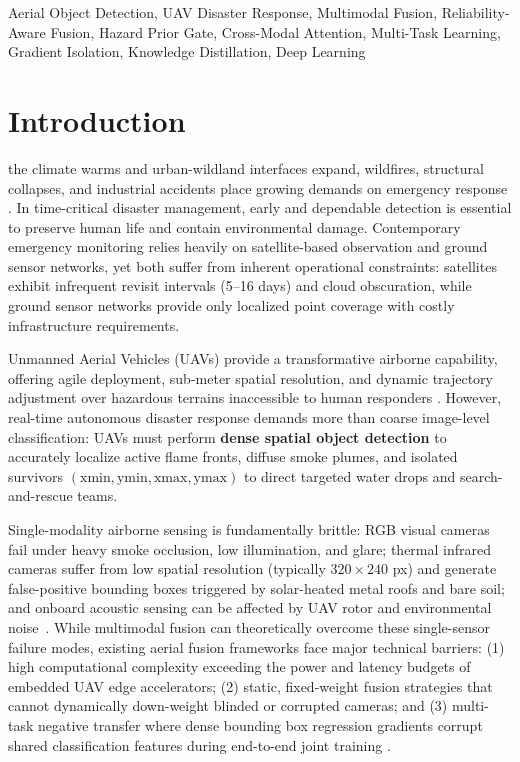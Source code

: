 \documentclass[journal]{IEEEtran}
\begin{document}
\begin{IEEEkeywords}
Aerial Object Detection, UAV Disaster Response, Multimodal Fusion, Reliability-Aware Fusion, Hazard Prior Gate, Cross-Modal Attention, Multi-Task Learning, Gradient Isolation, Knowledge Distillation, Deep Learning
\end{IEEEkeywords}

\IEEEpeerreviewmaketitle


\section{Introduction}

 the climate warms and urban-wildland interfaces expand, wildfires, structural collapses, and industrial accidents place growing demands on emergency response \cite{erdelj2017help}. In time-critical disaster management, early and dependable detection is essential to preserve human life and contain environmental damage. Contemporary emergency monitoring relies heavily on satellite-based observation and ground sensor networks, yet both suffer from inherent operational constraints: satellites exhibit infrequent revisit intervals (5--16 days) and cloud obscuration, while ground sensor networks provide only localized point coverage with costly infrastructure requirements.

Unmanned Aerial Vehicles (UAVs) provide a transformative airborne capability, offering agile deployment, sub-meter spatial resolution, and dynamic trajectory adjustment over hazardous terrains inaccessible to human responders \cite{merino2012unmanned}. However, real-time autonomous disaster response demands more than coarse image-level classification: UAVs must perform \textbf{dense spatial object detection} to accurately localize active flame fronts, diffuse smoke plumes, and isolated survivors $(\text{xmin}, \text{ymin}, \text{xmax}, \text{ymax})$ to direct targeted water drops and search-and-rescue teams.

Single-modality airborne sensing is fundamentally brittle: RGB visual cameras fail under heavy smoke occlusion, low illumination, and glare; thermal infrared cameras suffer from low spatial resolution (typically $320\times240$ px) and generate false-positive bounding boxes triggered by solar-heated metal roofs and bare soil; and onboard acoustic sensing can be affected by UAV rotor and environmental noise~\cite{gupta2025droneaudioset}. While multimodal fusion can theoretically overcome these single-sensor failure modes, existing aerial fusion frameworks face major technical barriers: (1) high computational complexity exceeding the power and latency budgets of embedded UAV edge accelerators; (2) static, fixed-weight fusion strategies that cannot dynamically down-weight blinded or corrupted cameras; and (3) multi-task negative transfer where dense bounding box regression gradients corrupt shared classification features during end-to-end joint training \cite{baltrusaitis2019multimodal, yu2020gradient}.
\end{document}
